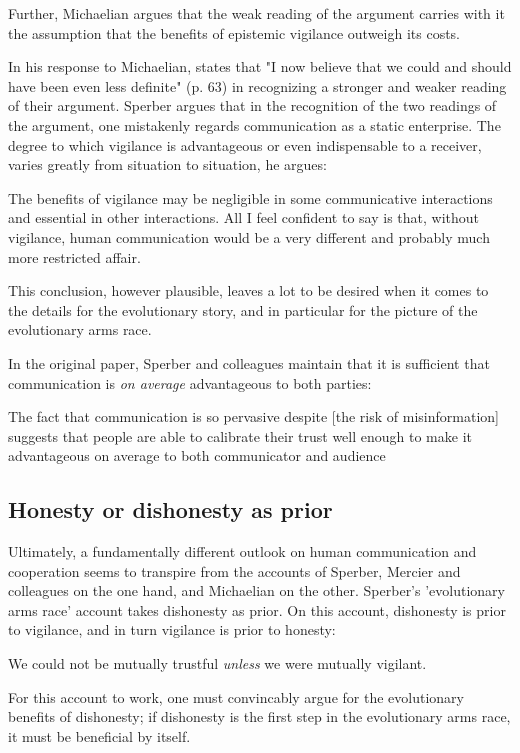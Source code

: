 Further, Michaelian argues that the weak reading of the argument carries with it the assumption that the benefits of epistemic vigilance outweigh its costs.

In his response to Michaelian, \citet{Sperber13} states that "I now believe that we could and should have been even less definite" (p. 63) in recognizing a stronger and weaker reading of their argument. Sperber argues that in the recognition of the two readings of the argument, one mistakenly regards communication as a static enterprise. The degree to which vigilance is advantageous or even indispensable to a receiver, varies greatly from situation to situation, he argues:

\begin{quoting}
    The benefits of vigilance may be negligible in some communicative interactions and essential in other interactions. All I feel confident to say is that, without vigilance, human communication would be a very different and probably much more restricted affair.
    \hfill \citep[p.~63]{Sperber13}
\end{quoting}
This conclusion, however plausible, leaves a lot to be desired when it comes to the details for the evolutionary story, and in particular for the picture of the evolutionary arms race.

In the original \citeyear{Sperber10} paper, Sperber and colleagues maintain that it is sufficient that communication is \emph{on average} advantageous to both parties:
\begin{quoting}
    The fact that communication is so pervasive despite [the risk of misinformation] suggests that people are able to calibrate their trust well enough to make it advantageous on average to both communicator and audience
    \hfill \citep[p.~360]{Sperber10}
\end{quoting}

\subsection{Honesty or dishonesty as prior}

Ultimately, a fundamentally different outlook on human communication and cooperation seems to transpire from the accounts of Sperber, Mercier and colleagues on the one hand, and Michaelian on the other. Sperber's 'evolutionary arms race' account takes dishonesty as prior. On this account, dishonesty is prior to vigilance, and in turn vigilance is prior to honesty:
\begin{quoting}
    We could not be mutually trustful \emph{unless} we were mutually vigilant.
    \hfill \citep[p.~364]{Sperber10}
\end{quoting}
For this account to work, one must convincably argue for the evolutionary benefits of dishonesty; if dishonesty is the first step in the evolutionary arms race, it must be beneficial by itself.

